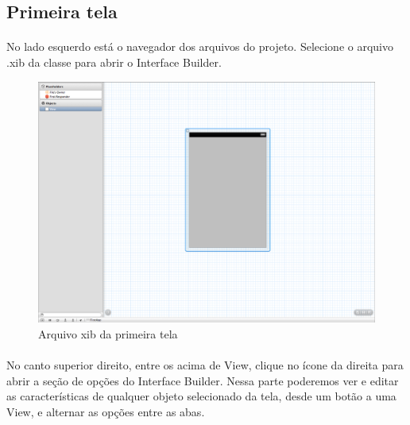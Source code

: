 \documentclass[a4paper,12pt,brazil,doubleside]{book}
\begin{document}
\bigskip

\subsection{Primeira tela}

\paragraph{}No lado esquerdo está o navegador dos arquivos do projeto. Selecione o arquivo .xib da classe para abrir o Interface Builder.

\begin{figure}[h]
  \centering
  \includegraphics[totalheight=0.4\textheight]{../figuras/ios/1/xib.png}
  \caption{Arquivo xib da primeira tela}
  \label{fig:a}
\end{figure}

\bigskip

\paragraph{}No canto superior direito, entre os acima de View, clique no ícone da direita  para abrir a seção de opções do Interface Builder. Nessa parte poderemos ver e editar as características de qualquer objeto selecionado da tela, desde um botão a uma View, e alternar as opções entre as abas.
\end{document}

